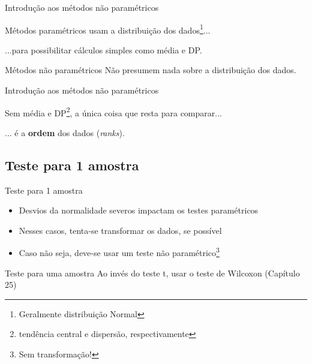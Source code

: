 \documentclass{beamer}
\begin{document}
\begin{frame}{Introdução aos métodos não paramétricos}
  \begin{block}{Métodos paramétricos}
    \footnotesize
    usam a distribuição dos dados\footnote{\tiny Geralmente distribuição Normal}...

    \bigskip
    ...para possibilitar cálculos simples como média e DP.
  \end{block}
  \bigskip
  \bigskip
  \bigskip
  \begin{block}{Métodos não paramétricos}
    Não presumem nada sobre a distribuição dos dados.
  \end{block}
\end{frame}

\begin{frame}{Introdução aos métodos não paramétricos}
  \begin{center}
    Sem média e DP\footnote{tendência central e dispersão, respectivamente}, a única coisa que resta para comparar...

    \bigskip
    ... é a {\bf ordem} dos dados ({\em ranks}).
  \end{center}
\end{frame}

\subsection[1 amostra]{Teste para 1 amostra}

\begin{frame}{Teste para 1 amostra}
  \begin{itemize}
    \small
  \item Desvios da normalidade severos impactam os testes paramétricos
    \bigskip
  \item Nesses casos, tenta-se transformar os dados, se possível
  \item Caso não seja, deve-se usar um teste não paramétrico\footnote{Sem transformação!}
  \end{itemize}
  \bigskip
  \begin{block}{Teste para uma amostra}
    Ao invés do teste t, usar o teste de Wilcoxon {\footnotesize (Capítulo 25)}
  \end{block}
\end{frame}
\end{document}

